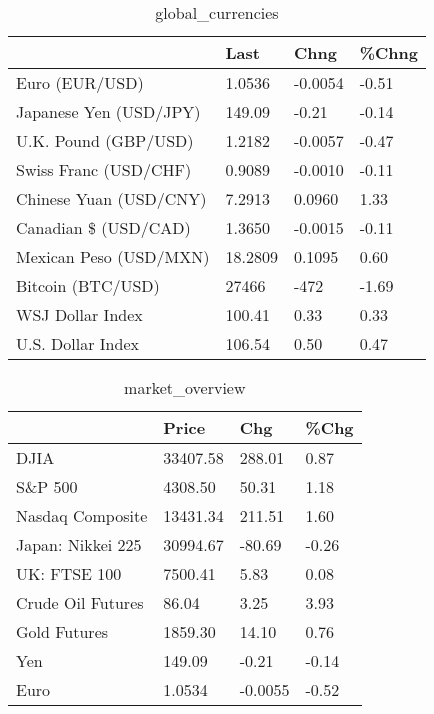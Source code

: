 \documentclass{article}%
\begin{document}
%


\begin{table}[htbp]%
\caption{global\_currencies}%
\centering%
\begin{adjustbox}{width=1\textwidth}%
\begin{tabular}{llll}
\toprule
                       &    Last &    Chng & \%Chng \\
\midrule
        Euro (EUR/USD) &  1.0536 & -0.0054 & -0.51 \\
Japanese Yen (USD/JPY) &  149.09 &   -0.21 & -0.14 \\
  U.K. Pound (GBP/USD) &  1.2182 & -0.0057 & -0.47 \\
 Swiss Franc (USD/CHF) &  0.9089 & -0.0010 & -0.11 \\
Chinese Yuan (USD/CNY) &  7.2913 &  0.0960 &  1.33 \\
  Canadian \$ (USD/CAD) &  1.3650 & -0.0015 & -0.11 \\
Mexican Peso (USD/MXN) & 18.2809 &  0.1095 &  0.60 \\
     Bitcoin (BTC/USD) &   27466 &    -472 & -1.69 \\
      WSJ Dollar Index &  100.41 &    0.33 &  0.33 \\
     U.S. Dollar Index &  106.54 &    0.50 &  0.47 \\
\bottomrule
\end{tabular}
%
\end{adjustbox}%
\end{table}

%


\begin{table}[htbp]%
\caption{market\_overview}%
\centering%
\begin{adjustbox}{width=1\textwidth}%
\begin{tabular}{llll}
\toprule
                  &    Price &     Chg &  \%Chg \\
\midrule
             DJIA & 33407.58 &  288.01 &  0.87 \\
          S\&P 500 &  4308.50 &   50.31 &  1.18 \\
 Nasdaq Composite & 13431.34 &  211.51 &  1.60 \\
Japan: Nikkei 225 & 30994.67 &  -80.69 & -0.26 \\
     UK: FTSE 100 &  7500.41 &    5.83 &  0.08 \\
Crude Oil Futures &    86.04 &    3.25 &  3.93 \\
     Gold Futures &  1859.30 &   14.10 &  0.76 \\
              Yen &   149.09 &   -0.21 & -0.14 \\
             Euro &   1.0534 & -0.0055 & -0.52 \\
\bottomrule
\end{tabular}
%
\end{adjustbox}%
\end{table}

%
\end{document}
